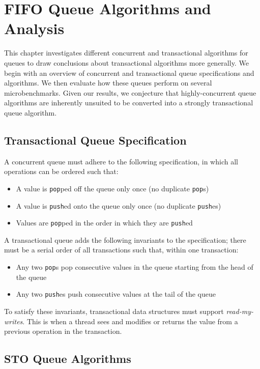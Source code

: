 \chapter{FIFO Queue Algorithms and Analysis}
\label{Queue}

This chapter investigates different concurrent and transactional algorithms for queues to draw conclusions about transactional algorithms more generally. We begin with an overview of concurrent and transactional queue specifications and algorithms. We then evaluate how these queues perform on several microbenchmarks. Given our results, we conjecture that highly-concurrent queue algorithms are inherently unsuited to be converted into a strongly transactional queue algorithm.

\section{Transactional Queue Specification}

A concurrent queue must adhere to the following specification, in which all operations can be ordered such that:
\begin{itemize}
    \item A value is \texttt{pop}ped off the queue only once (no duplicate \texttt{pop}s)
    \item A value is \texttt{push}ed onto the queue only once (no duplicate \texttt{push}es)
    \item Values are \texttt{pop}ped in the order in which they are \texttt{push}ed
\end{itemize}

A transactional queue adds the following invariants to the specification; there must be a serial order of all transactions such that, within one transaction:
\begin{itemize}
    \item Any two \texttt{pop}s pop consecutive values in the queue starting from the head of the queue 
    \item Any two \texttt{push}es push consecutive values at the tail of the queue
\end{itemize}

To satisfy these invariants, transactional data structures must support \emph{read-my-writes}. This is when a thread sees and modifies or returns the value from a previous operation in the transaction.

\section{STO Queue Algorithms}

